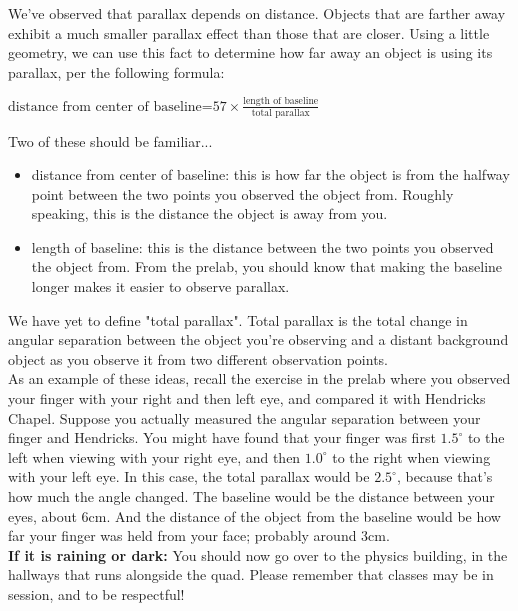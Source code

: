 \documentclass[11pt]{article}
\begin{document}
We've observed that parallax depends on distance. Objects that are farther away exhibit a much smaller parallax effect than those that are closer. Using a little geometry, we can use this fact to determine how far away an object is using its parallax, per the following formula:

\begin{center}
	$\text{distance from center of baseline=}57\times\frac{\text{length of baseline}}{\text{total parallax}}$
\end{center}

Two of these should be familiar...
\begin{itemize}
	\item distance from center of baseline: this is how far the object is from the halfway point between the two points you observed the object from. Roughly speaking, this is the distance the object is away from you.
	\item length of baseline: this is the distance between the two points you observed the object from. From the prelab, you should know that making the baseline longer makes it easier to observe parallax.
\end{itemize}
We have yet to define "total parallax". Total parallax is the total change in angular separation between the object you're observing and a distant background object as you observe it from two different observation points.\\

As an example of these ideas, recall the exercise in the prelab where you observed your finger with your right and then left eye, and compared it with Hendricks Chapel. Suppose you actually measured the angular separation between your finger and Hendricks. You might have found that your finger was first $1.5^\circ$ to the left when viewing with your right eye, and then $1.0^\circ$ to the right when viewing with your left eye. In this case, the total parallax would be $2.5^\circ$, because that's how much the angle changed. The baseline would be the distance between your eyes, about 6cm. And the distance of the object from the baseline would be how far your finger was held from your face; probably around 3cm. \\

\textbf{If it is raining or dark:} You should now go over to the physics building, in the hallways that runs alongside the quad. Please remember that classes may be in session, and to be respectful!\\
\end{document}
